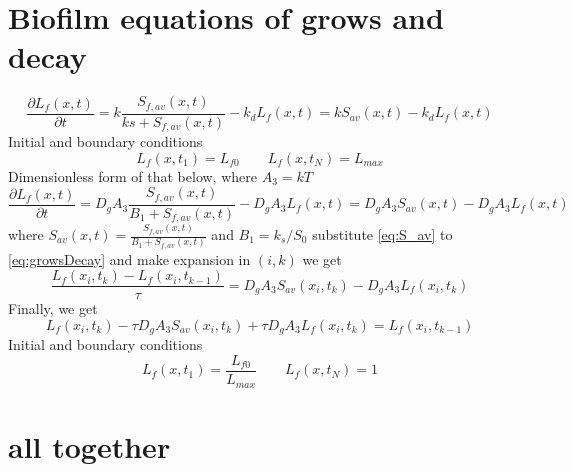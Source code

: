 \documentclass[12pt]{article}
\begin{document}
\section{Biofilm equations of grows and decay}
\begin{equation}
\frac{\partial L_f(x,t)}{\partial t}=k\frac{S_{f,av}(x,t)}{ks+S_{f,av}(x,t)}-k_dL_f{(x,t)}=kS_{av}(x,t)-k_dL_f{(x,t)}
\end{equation}
Initial and boundary conditions
\begin{equation}\label{eq:biofilmB}
L_f(x, t_1) = L_{f0}
\qquad
L_f(x, t_N) = L_{max} 
\end{equation}
Dimensionless form of that below, where $A_3=kT$
\begin{equation}\label{eq:growsDecay}
\frac{\partial L_f(x,t)}{\partial t}=D_gA_3\frac{S_{f,av}(x,t)}{B_1+S_{f,av}(x,t)}-D_gA_3L_f{(x,t)}=D_gA_3S_{av}(x,t)-D_gA_3L_f{(x,t)}
\end{equation}	 
where $S_{av}(x,t) = \frac{S_{f,av}(x,t)}{B_1+S_{f,av}(x,t)}$ and $B_1=k_s/S_0$
substitute \eqref{eq:S_av} to \eqref{eq:growsDecay} and make expansion in $(i, k)$ we get
\begin{equation}
\frac{L_f(x_i,t_k)-L_f(x_i,t_{k-1})}{\tau}=D_gA_3S_{av}(x_i, t_k)-D_gA_3L_f{(x_i,t_k)}
\end{equation}
Finally, we get
\begin{equation}
	L_f(x_i,t_k)-\tau D_gA_3S_{av}(x_i, t_k)+\tau D_gA_3L_f{(x_i,t_k)}=
	L_f(x_i,t_{k-1})
\end{equation}
Initial and boundary conditions
\begin{equation}\label{eq:biofilmB}
L_f(x, t_1) = \frac{L_{f0}}{L_{max}}
\qquad
L_f(x, t_N) = 1 
\end{equation}




\section{all together}
\end{document}
